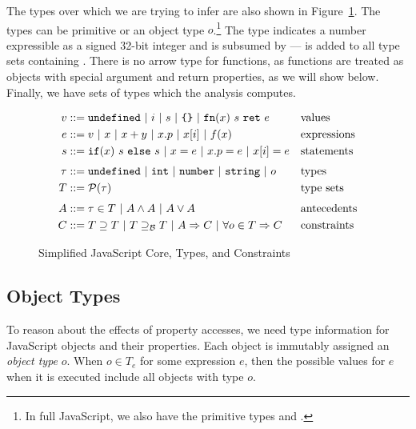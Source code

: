 The types over which we are trying to infer are also shown in
Figure~\ref{fig:js-core}. The types can be primitive or an object type
$o$.\footnote{In full JavaScript, we also have the primitive types 
  and .} The  type indicates a number expressible as a
signed 32-bit integer and is subsumed by  ---  is added
to all type sets containing . There is no arrow type for
functions, as functions are treated as objects with special argument and
return properties, as we will show below. Finally, we have sets of types
which the analysis computes.

\newcommand{\barrier}{\supseteq_\mathcal{B}}

\begin{figure}
\begin{align*}
v & ::= \code{undefined}\ |\ i\ |\ s\ |\ \text{\code{\{\}}}\ |\ \code{fn}(x)\ s\ \code{ret}\ e&& \text{values}\\
e & ::= v\ |\ x\ |\ x + y\ |\ x.p\ |\ x[i]\ |\ f(x) && \text{expressions}\\
s & ::= \code{if}(x)\ s\ \code{else}\ s\ |\ x = e\ |\ x.p = e\ |\ x[i] = e && \text{statements}\\[0.7ex]
\tau & ::= \code{undefined}\ |\ \code{int}\ |\ \code{number}\ |\ \code{string}\ |\ o && \text{types}\\
T & ::= \mathcal{P}(\tau) && \text{type sets}\\[0.8ex]
A & ::= \tau \in T\ |\ A \wedge A\ |\ A \vee A && \text{antecedents}\\
C & ::= T \supseteq T\ |\ T \barrier T\ |\ A \Implies C\ |\ \forall o \in T \Implies C && \text{constraints}
\end{align*}
\caption{Simplified JavaScript Core, Types, and Constraints}
\label{fig:js-core}
\end{figure}



\subsection{Object Types}
\label{sec:object-types}

To reason about the effects of property accesses, we need type information
for JavaScript objects and their properties.
Each object is immutably assigned an {\it object type} $o$.
When $o \in T_e$ for some expression $e$, then the possible values
for $e$ when it is executed include all objects with type $o$.


